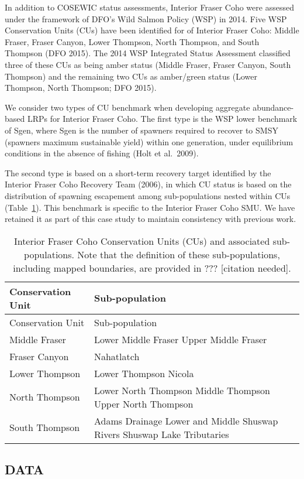\documentclass[11pt]{book}
\begin{document}
In addition to COSEWIC status assessments, Interior Fraser Coho were assessed under the framework of DFO's Wild Salmon Policy (WSP) in 2014. Five WSP Conservation Units (CUs) have been identified for of Interior Fraser Coho: Middle Fraser, Fraser Canyon, Lower Thompson, North Thompson, and South Thompson (DFO 2015). The 2014 WSP Integrated Status Assessment classified three of these CUs as being amber status (Middle Fraser, Fraser Canyon, South Thompson) and the remaining two CUs as amber/green status (Lower Thompson, North Thompson; DFO 2015).

We consider two types of CU benchmark when developing aggregate abundance-based LRPs for Interior Fraser Coho. The first type is the WSP lower benchmark of Sgen, where Sgen is the number of spawners required to recover to SMSY (spawners maximum sustainable yield) within one generation, under equilibrium conditions in the absence of fishing (Holt et al.~2009).

The second type is based on a short-term recovery target identified by the Interior Fraser Coho Recovery Team (2006), in which CU status is based on the distribution of spawning escapement among sub-populations nested within CUs (Table~\ref{tab:cohoCU2SP}). This benchmark is specific to the Interior Fraser Coho SMU. We have retained it as part of this case study to maintain consistency with previous work.
\begin{longtable}[]{@{}
  >{\raggedright\arraybackslash}p{}
  >{\raggedright\arraybackslash}p{}@{}}
\caption{\label{tab:cohoCU2SP} Interior Fraser Coho Conservation Units (CUs) and associated sub-populations. Note that the definition of these sub-populations, including mapped boundaries, are provided in ??? {[}citation needed{]}.}\tabularnewline
\toprule
Conservation Unit & Sub-population \\
\midrule
\endfirsthead
\toprule
Conservation Unit & Sub-population \\
\midrule
\endhead
Middle Fraser & Lower Middle Fraser Upper Middle Fraser \\
Fraser Canyon & Nahatlatch \\
Lower Thompson & Lower Thompson Nicola \\
North Thompson & Lower North Thompson Middle Thompson Upper North Thompson \\
South Thompson & Adams Drainage Lower and Middle Shuswap Rivers Shuswap Lake Tributaries \\
\bottomrule
\end{longtable}
\hypertarget{data}{%
\subsection{DATA}\label{data}}
\end{document}
